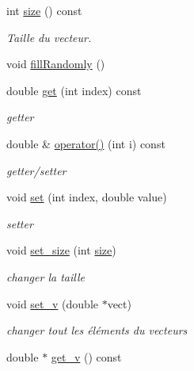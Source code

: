 \begin{DoxyCompactItemize}
\mbox{\label{class_dvector_adda9654f389de24c744e897e93f850fb}} 
int \hyperlink{class_dvector_adda9654f389de24c744e897e93f850fb}{size} () const
\begin{DoxyCompactList}\small\item\em Taille du vecteur. \end{DoxyCompactList}\item 
void \hyperlink{class_dvector_a6fecdca0fbad7f928403597e322234b1}{fill\+Randomly} ()
\item 
\mbox{\label{class_dvector_a2e07a00d750b98b10b3413227a7da46d}} 
double \hyperlink{class_dvector_a2e07a00d750b98b10b3413227a7da46d}{get} (int index) const
\begin{DoxyCompactList}\small\item\em getter \end{DoxyCompactList}\item 
double \& \hyperlink{class_dvector_a237ba8b1ca7e68f78ec3f85ae800cbec}{operator()} (int i) const
\begin{DoxyCompactList}\small\item\em getter/setter \end{DoxyCompactList}\item 
void \hyperlink{class_dvector_a2ea1ba5bf87cebf7e74cb0dd94f90e12}{set} (int index, double value)
\begin{DoxyCompactList}\small\item\em setter \end{DoxyCompactList}\item 
void \hyperlink{class_dvector_a5d4b7a3273803031a7fb2b5516e5dd11}{set\+\_\+size} (int \hyperlink{class_dvector_adda9654f389de24c744e897e93f850fb}{size})
\begin{DoxyCompactList}\small\item\em changer la taille \end{DoxyCompactList}\item 
void \hyperlink{class_dvector_a99c6f3bc6f2d285ec2f9d8bd32a32218}{set\+\_\+v} (double $\ast$vect)
\begin{DoxyCompactList}\small\item\em changer tout les éléments du vecteurs \end{DoxyCompactList}\item 
\mbox{\label{class_dvector_a100044e17131842814e0dee6c17e1ef7}} 
double $\ast$ \hyperlink{class_dvector_a100044e17131842814e0dee6c17e1ef7}{get\+\_\+v} () const

\end{DoxyCompactItemize}
